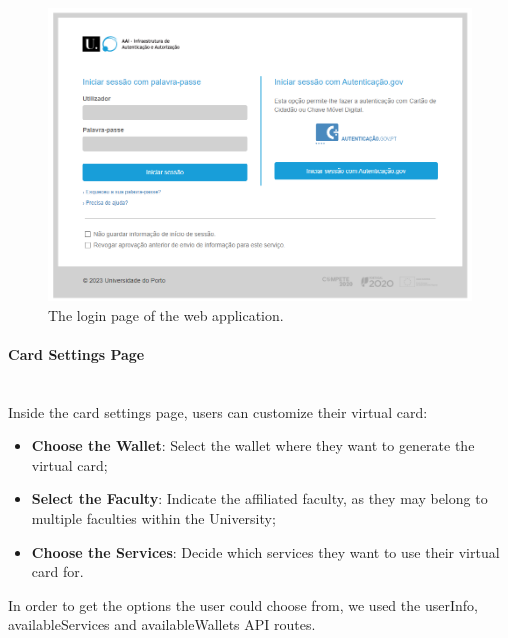 \documentclass[12pt]{article}
\begin{document}
\begin{figure}[H]
	\centering
	\includegraphics[width=\textwidth]{login_page.png}
	\caption{The login page of the web application.}
\end{figure}

\paragraph{Card Settings Page}\mbox{}\\
Inside the card settings page, users can customize their virtual card:

\begin{itemize}

	\item \textbf{Choose the Wallet}: Select the wallet where they want to generate the virtual card;
	\item \textbf{Select the Faculty}: Indicate the affiliated faculty, as they may belong to multiple faculties within the University;
	\item \textbf{Choose the Services}: Decide which services they want to use their virtual card for.

\end{itemize}

In order to get the options the user could choose from, we used the userInfo, availableServices and availableWallets API routes.
\end{document}

